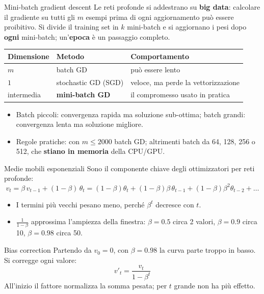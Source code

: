 \documentclass[aspectratio=169]{beamer}
\begin{document}
\begin{frame}{Mini-batch gradient descent}
  Le reti profonde si addestrano su \textbf{big data}: calcolare il gradiente
  su tutti gli $m$ esempi prima di ogni aggiornamento può essere proibitivo.
  Si divide il training set in $k$ mini-batch e si aggiornano i pesi dopo
  \textbf{ogni} mini-batch; un'\textbf{epoca} è un passaggio completo.
  \vspace{0.2cm}
  \begin{center}
  \begin{tabular}{lll}
    \toprule
    Dimensione & Metodo & Comportamento \\
    \midrule
    $m$ & batch GD & può essere lento \\
    $1$ & stochastic GD (SGD) & veloce, ma perde la vettorizzazione \\
    intermedia & \textbf{mini-batch GD} & il compromesso usato in pratica \\
    \bottomrule
  \end{tabular}
  \end{center}
  \vspace{0.2cm}
  \begin{itemize}
    \item Batch piccoli: convergenza rapida ma soluzione sub-ottima; batch
          grandi: convergenza lenta ma soluzione migliore.
    \item Regole pratiche: con $m \le 2000$ batch GD; altrimenti batch da 64,
          128, 256 o 512, che \textbf{stiano in memoria} della CPU/GPU.
  \end{itemize}
\end{frame}

\begin{frame}{Medie mobili esponenziali}
  Sono il componente chiave degli ottimizzatori per reti profonde:
  \[ v_t = \beta\, v_{t-1} + (1-\beta)\,\theta_t
     = (1-\beta)\theta_t + (1-\beta)\beta\,\theta_{t-1}
     + (1-\beta)\beta^2\theta_{t-2} + \dots \]
  \begin{itemize}
    \item I termini più vecchi pesano meno, perché $\beta^t$ decresce con $t$.
    \item $\frac{1}{1-\beta}$ approssima l'ampiezza della finestra: $\beta=0.5$
          circa 2 valori, $\beta=0.9$ circa 10, $\beta=0.98$ circa 50.
  \end{itemize}
  \begin{block}{Bias correction}
    Partendo da $v_0=0$, con $\beta=0.98$ la curva parte troppo in basso. Si
    corregge ogni valore:
    \[ v'_t = \frac{v_t}{1-\beta^{t}} \]
    All'inizio il fattore normalizza la somma pesata; per $t$ grande non ha
    più effetto.
  \end{block}
\end{frame}
\end{document}
